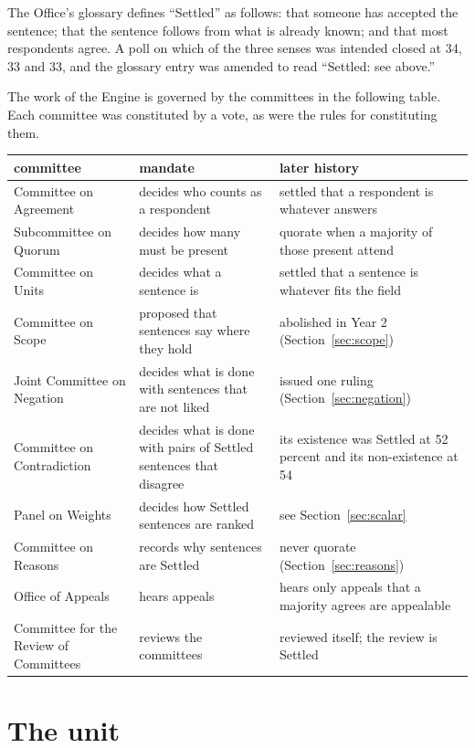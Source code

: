 \documentclass[11pt]{article}
\begin{document}
The Office's glossary defines ``Settled'' as follows: that someone has accepted the sentence; that the sentence follows from what is already known; and that most respondents agree. A poll on which of the three senses was intended closed at 34, 33 and 33, and the glossary entry was amended to read ``Settled: see above.''

The work of the Engine is governed by the committees in the following table. Each committee was constituted by a vote, as were the rules for constituting them.

\begin{center}
\small
\begin{tabularx}{\textwidth}{@{}l X X@{}}
\toprule
committee & mandate & later history\\
\midrule
Committee on Agreement & decides who counts as a respondent & settled that a respondent is whatever answers\\
Subcommittee on Quorum & decides how many must be present & quorate when a majority of those present attend\\
Committee on Units & decides what a sentence is & settled that a sentence is whatever fits the field\\
Committee on Scope & proposed that sentences say where they hold & abolished in Year 2 (Section~\ref{sec:scope})\\
Joint Committee on Negation & decides what is done with sentences that are not liked & issued one ruling (Section~\ref{sec:negation})\\
Committee on Contradiction & decides what is done with pairs of Settled sentences that disagree & its existence was Settled at 52 percent and its non-existence at 54\\
Panel on Weights & decides how Settled sentences are ranked & see Section~\ref{sec:scalar}\\
Committee on Reasons & records why sentences are Settled & never quorate (Section~\ref{sec:reasons})\\
Office of Appeals & hears appeals & hears only appeals that a majority agrees are appealable\\
Committee for the Review of Committees & reviews the committees & reviewed itself; the review is Settled\\
\bottomrule
\end{tabularx}
\end{center}

\section{The unit}\label{sec:units}
\end{document}
